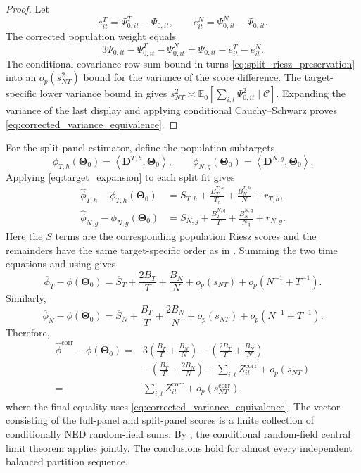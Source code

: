 \documentclass[11pt]{article}
\numberwithin{equation}{section}
\theoremstyle{remark}
\newcommand{\Ezero}{\mathbb E_0}
\newcommand{\ip}[2]{\left\langle #1,#2\right\rangle}
\newcommand{\bD}{\bm D}
\newcommand{\bTheta}{\bm\Theta}
\begin{document}
\begin{proof}
Let
$$
e_{it}^{T}=\Psi_{0,it}^{T}-\Psi_{0,it},
\qquad
 e_{it}^{N}=\Psi_{0,it}^{N}-\Psi_{0,it}.
$$
The corrected population weight equals
$$
3\Psi_{0,it}
-\Psi_{0,it}^{T}
-\Psi_{0,it}^{N}
=
\Psi_{0,it}-e_{it}^{T}-e_{it}^{N}.
$$
The conditional covariance row-sum bound in  turns \eqref{eq:split_riesz_preservation} into an $o_p(s_{NT}^2)$ bound for the variance of the score difference. The target-specific lower variance bound in  gives $s_{NT}^2\asymp\Ezero[\sum_{i,t}\Psi_{0,it}^2\mid\mathscr C]$. Expanding the variance of the last display and applying conditional Cauchy--Schwarz proves \eqref{eq:corrected_variance_equivalence}.
\end{proof}

For the split-panel estimator, define the population subtargets
$$
\phi_{T,h}(\bTheta_0)
=
\ip{\bD^{T,h}}{\bTheta_0},
\qquad
\phi_{N,g}(\bTheta_0)
=
\ip{\bD^{N,g}}{\bTheta_0}.
$$
Applying \eqref{eq:target_expansion} to each split fit gives
\begin{align*}
\widehat\phi_{T,h}-\phi_{T,h}(\bTheta_0)
&=
S_{T,h}
+
\frac{B_T^{T,h}}{T_h}
+
\frac{B_N^{T,h}}{N}
+
 r_{T,h},\\
\widehat\phi_{N,g}-\phi_{N,g}(\bTheta_0)
&=
S_{N,g}
+
\frac{B_T^{N,g}}{T}
+
\frac{B_N^{N,g}}{N_g}
+
 r_{N,g}.
\end{align*}
Here the $S$ terms are the corresponding population Riesz scores and the remainders have the same target-specific order as in . Summing the two time equations and using  gives
$$
\overline\phi_T-\phi(\bTheta_0)
=
\overline S_T
+
\frac{2B_T}{T}
+
\frac{B_N}{N}
+
o_p(s_{NT})+o_p(N^{-1}+T^{-1}).
$$
Similarly,
$$
\overline\phi_N-\phi(\bTheta_0)
=
\overline S_N
+
\frac{B_T}{T}
+
\frac{2B_N}{N}
+
o_p(s_{NT})+o_p(N^{-1}+T^{-1}).
$$
Therefore,
\begin{align*}
\widehat\phi^{\mathrm{corr}}-\phi(\bTheta_0)
={}&
3\left(
\frac{B_T}T+\frac{B_N}N
\right)
-
\left(
\frac{2B_T}T+\frac{B_N}N
\right)
\nonumber\\
&-
\left(
\frac{B_T}T+\frac{2B_N}N
\right)
+
\sum_{i,t}Z_{it}^{\mathrm{corr}}
+
o_p(s_{NT})
\nonumber\\
={}&
\sum_{i,t}Z_{it}^{\mathrm{corr}}
+
o_p(s_{NT}^{\mathrm{corr}}),
\end{align*}
where the final equality uses \eqref{eq:corrected_variance_equivalence}. The vector consisting of the full-panel and split-panel scores is a finite collection of conditionally NED random-field sums. By , the conditional random-field central limit theorem applies jointly. The conclusions hold for almost every independent balanced partition sequence.
\end{document}
